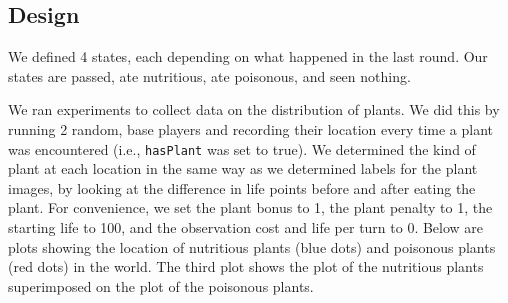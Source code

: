 \documentclass[solution, letterpaper]{cs121}
\begin{document}
\subsection{Design}
We defined 4 states, each depending on what happened in the last round. Our states are {\sc passed}, {\sc ate nutritious}, {\sc ate poisonous}, and {\sc seen nothing}.

We ran experiments to collect data on the distribution of plants. We did this by running 2 random, base players and recording their location every time a plant was encountered (i.e., {\tt hasPlant} was set to true). We determined the kind of plant at each location in the same way as we determined labels for the plant images, by looking at the difference in life points before and after eating the plant. For convenience, we set the plant bonus to 1, the plant penalty to 1, the starting life to 100, and the observation cost and life per turn to 0. Below are plots showing the location of nutritious plants (blue dots) and poisonous plants (red dots) in the world. The third plot shows the plot of the nutritious plants superimposed on the plot of the poisonous plants.
\end{document}
